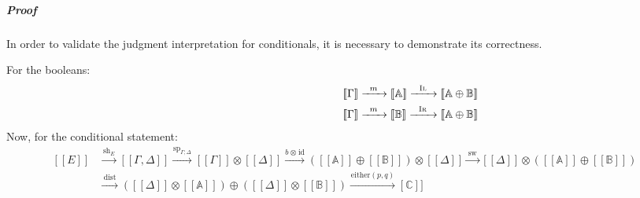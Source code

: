 \subparagraph{Proof} In order to validate the judgment interpretation for conditionals, it is necessary to demonstrate its correctness.

For the booleans: 
\begin{equation} \label{eq:proof_bool}
 \begin{aligned} 
    \hspace{120pt}&  [\![\Gamma ]\!]   \xrightarrow{\hspace{5pt}m\hspace{5pt}} [\![\mathbb{A} ]\!] \xrightarrow{\hspace{6pt}\textsc{Il}\hspace{6pt}} [\![\mathbb{A} \oplus \mathbb{B}]\!] \\ 
     &[\![\Gamma ]\!]   \xrightarrow{\hspace{5pt}m\hspace{5pt}} [\![\mathbb{B} ]\!] \xrightarrow{\hspace{6pt}\textsc{Ir}\hspace{6pt}} [\![\mathbb{A} \oplus \mathbb{B}]\!]
\end{aligned}   
\end{equation}
Now, for the conditional statement:
\begin{equation} \label{eq:proof_bool}
 \begin{aligned} 
    [\![E]\!] & \xrightarrow{\hspace{2pt}\text{sh}_{E}\hspace{2pt}}   [\![\Gamma,\Delta ]\!]   \xrightarrow{\hspace{1pt}\text{sp}_{\Gamma;\Delta}\hspace{1pt}}  [\![\Gamma ]\!] \otimes [\![\Delta ]\!] \xrightarrow{ b \hspace{1pt} \otimes \hspace{1pt} \text{id}} ([\![\mathbb{A} ]\!] \oplus [\![\mathbb{B} ]\!]) \otimes [\![\Delta ]\!] \xrightarrow{\hspace{2pt}\text{sw}\hspace{2pt}}  [\![\Delta ]\!] \otimes ([\![\mathbb{A} ]\!] \oplus [\![\mathbb{B} ]\!])  \\
    & \xrightarrow{\hspace{3pt}\text{dist}\hspace{3pt}} ([\![\Delta ]\!] \otimes [\![\mathbb{A} ]\!]  ) \oplus (  [\![\Delta ]\!] \otimes [\![\mathbb{B} ]\!] ) \xrightarrow{\hspace{1pt}\text{either}(p,q)\hspace{1pt}} \![\mathbb{C} ]\!]
\end{aligned}   
\end{equation}


